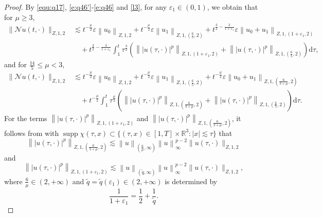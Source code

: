 \documentclass[11pt,twoside]{article}
\newcommand{\R}{\mathbb R}
\newcommand{\ve}{\varepsilon}
\newcommand{\f}{\frac}
\theoremstyle{plain}
\theoremstyle{definition}
\theoremstyle{remark}
\numberwithin{equation}{section}
\begin{document}
\begin{proof}
By \eqref{equ:q17}, \eqref{e:q46'}-\eqref{e:q46} and \eqref{l3}, for any $\varepsilon_1\in(0,1)$, we obtain that for $\mu\geq3$,
\begin{equation}\label{Q6}
\begin{aligned}
\|\mathcal{N} u(t, \cdot)\|_{Z, 1, 2} &\lesssim t^{-\f{\mu}{2}}\ve\left\|u_0\right\|_{Z, 1, 2}
+t^{-\f{\mu}{2}}\ve\left\|u_1\right\|_{Z, 1,(\f65, 2)}
+t^{\f32-\f{3}{1+\ve_1}}\ve\left\|u_0+u_1\right\|_{Z, 1,(1+\varepsilon_1, 2)}\\
&\quad+ t^{\f32-\f{3}{1+\ve_1}}\int_{1}^{t} \tau^{\f32}\left(\left\||u(\tau, \cdot)|^p\right\|_{Z, 1,(1+\varepsilon_1, 2)}+\left\||u(\tau, \cdot)|^p\right\|_{Z, 1,(\f65, 2)}\right)\mathrm{d}\tau,
\end{aligned}
\end{equation}
and for $\f{14}{5}\leq\mu<3$,
\begin{equation}\label{Q6'}
\begin{aligned}
\|\mathcal{N} u(t, \cdot)\|_{Z, 1, 2} &\lesssim t^{-\f{\mu}{2}}\ve\left\|u_0\right\|_{Z, 1, 2}
+t^{-\f{\mu}{2}}\ve\left\|u_1\right\|_{Z, 1,(\f65, 2)}
+t^{-\f{\mu}{2}}\ve\left\|u_0+u_1\right\|_{Z, 1,(\f{6}{3+\mu}, 2)}\\
&\quad+ t^{-\f{\mu}{2}}\int_{1}^{t} \tau^{\f{\mu}{2}}\left(\left\||u(\tau, \cdot)|^p\right\|_{Z, 1,(\f{6}{3+\mu}, 2)}+\left\||u(\tau, \cdot)|^p\right\|_{Z, 1,(\f65, 2)}\right)\mathrm{d}\tau.
\end{aligned}
\end{equation}
For the terms $\left\||u(\tau, \cdot)|^p\right\|_{Z, 1,(1+\varepsilon_1, 2)}$ and $\left\||u(\tau, \cdot)|^p\right\|_{Z, 1,(\f{6}{3+\mu}, 2)}$,
it follows from \cite[(5.1.21)]{LZ} with $\operatorname{supp} \chi(\tau, x)\subset\{(\tau, x)\in[1, T]\times \R^3: |x|\lesssim \tau\}$ that
\begin{equation}\label{Q8}
\left\||u(\tau, \cdot)|^p\right\|_{Z, 1,(\f{6}{3+\mu}, 2)} \lesssim  \left\|u\right\|_{(\f{6}{\mu}, \infty)}\left\|u\right\|^{p-2}_{\infty}\|u(\tau, \cdot)\|_{Z, 1,2}
\end{equation}
and
\begin{equation}\label{Q8}
\left\||u(\tau, \cdot)|^p\right\|_{Z, 1,(1+\varepsilon_1, 2)} \lesssim  \left\|u\right\|_{(\tilde{q}, \infty)}\left\|u\right\|^{p-2}_{\infty}\|u(\tau, \cdot)\|_{Z, 1,2},
\end{equation}
where $\f{6}{\mu}\in(2, +\infty)$ and $\tilde{q}=\tilde{q}(\varepsilon_1)\in(2, +\infty)$ is determined by
\begin{equation}\label{Q9}
\f{1}{1+\varepsilon_1}=\f{1}{2}+\f{1}{\tilde{q}}.
\end{equation}



\end{proof}
\end{document}

